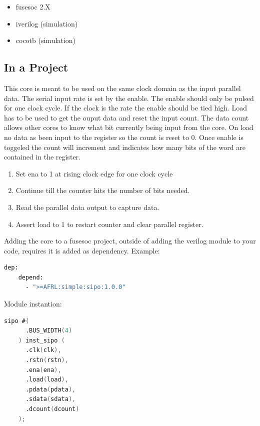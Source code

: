 \begin{itemize}
  \item fusesoc 2.X
  \item iverilog (simulation)
  \item cocotb (simulation)
\end{itemize}



\subsection{In a Project}
\par
This core is meant to be used on the same clock domain as the input parallel data. The serial input rate is set by the enable.
The enable should only be pulsed for one clock cycle. If the clock is the rate the enable should be tied high. Load has to be
used to get the ouput data and reset the input count. The data count allows other cores to know what bit currently being
input from the core. On load no data as been input to the register so the count is reset to 0. Once enable is toggeled the count
will increment and indicates how many bits of the word are contained in the register.
\begin{enumerate}
  \item Set ena to 1 at rising clock edge for one clock cycle
  \item Continue till the counter hits the number of bits needed.
  \item Read the parallel data output to capture data.
  \item Assert load to 1 to restart counter and clear parallel register.
\end{enumerate}

Adding the core to a fusesoc project, outside of adding the verilog module to your code, requires it is added as dependency.
Example:
\begin{lstlisting}[language=bash]
  dep:
    depend:
      - ">=AFRL:simple:sipo:1.0.0"
\end{lstlisting}

Module instantion:
\begin{lstlisting}[language=Verilog]
    sipo #(
      .BUS_WIDTH(4)
    ) inst_sipo (
      .clk(clk),
      .rstn(rstn),
      .ena(ena),
      .load(load),
      .pdata(pdata),
      .sdata(sdata),
      .dcount(dcount)
    );
\end{lstlisting}

